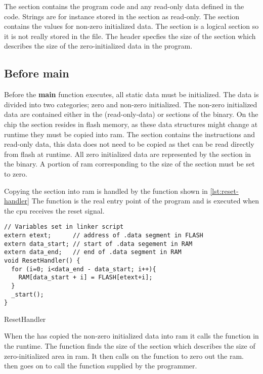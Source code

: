 The  section contains the program code and any read-only data defined in the code.
Strings are for instance stored in the  section as read-only.
The  section contains the values for non-zero initialized data.
The  section is a logical section so it is not really stored in the file.
The header specfies the size of the  section which describes the size of the zero-initialized data in the program.

\subsection{Before main}

Before the \textbf{main} function executes, all static data must be initialized.
The data is divided into two categories; zero and non-zero initialized.
The non-zero initialized data are contained either in the  (read-only-data) or  sections of the {\elf} binary.
On the chip the  section resides in flash memory, as these data structures might change at runtime they must be copied into \gls{ram}.
The  section contains the instructions and read-only data, this data does not need to be copied as thet can be read directly from flash at runtime.
All zero initialized data are represented by the  section in the {\elf} binary.
A portion of \gls{ram} corresponding to the size of the  section must be set to zero.

Copying the  section into \gls{ram} is handled by the  function shown in \autoref{lst:reset-handler}
The function is the real entry point of the program and is executed when the \gls{cpu} receives the reset signal.

\begin{listing}[H]
\begin{verbatim}
// Variables set in linker script
extern etext;      // address of .data segment in FLASH
extern data_start; // start of .data segement in RAM
extern data_end;   // end of .data segment in RAM
void ResetHandler() {
  for (i=0; i<data_end - data_start; i++){
    RAM[data_start + i] = FLASH[etext+i];
  }
  _start();
}
\end{verbatim}
\caption{ResetHandler}
\label{lst:reset-handler}
\end{listing}

When the  has copied the non-zero initialized data into \gls{ram} it calls the  function in the {\C} runtime.
The  function finds the size of the  section which describes the size of zero-initialized area in \gls{ram}.
It then calls on the  function to zero out the \gls{ram}.
 then goes on to call the {\main} function supplied by the programmer.

